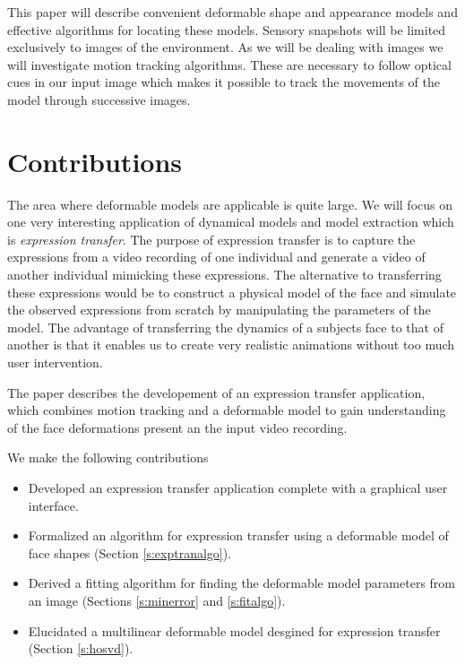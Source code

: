 \documentclass[11pt,a4paper]{report}
\begin{document}
This paper will describe convenient deformable shape
and appearance models and effective algorithms for locating these
models. Sensory snapshots will be limited exclusively to images of the environment. As we will be dealing
with images we will investigate motion tracking algorithms. These are necessary
to follow optical cues in our input image which makes it possible to track the
movements of the model through successive images.

\section{Contributions}

The area where deformable models are applicable is quite large. We will focus on one very interesting application of dynamical
models and model extraction which is
\textit{expression transfer}. The purpose of expression transfer is to capture
the expressions from a video recording of one individual and
generate a video of another individual mimicking these
expressions. The alternative to transferring these expressions would
be to construct a physical model of the face and simulate the observed
expressions from scratch by manipulating the parameters of the model. The
advantage of transferring the dynamics of a subjects face to that of another is
that it enables us to
create very realistic animations without too much user intervention. 

The paper describes the developement of an expression transfer application, which combines motion tracking and a deformable
model to gain understanding of the face deformations present an the input video
recording. 

We make the following contributions
\begin{itemize}
\item Developed an expression transfer application complete with a graphical
  user interface. 
\item Formalized an algorithm for expression transfer using a deformable model
  of face shapes (Section \ref{s:exptranalgo}).
\item Derived a fitting algorithm for finding the deformable model
  parameters from an image (Sections \ref{s:minerror} and \ref{s:fitalgo}).
\item Elucidated a multilinear deformable model desgined for expression
  transfer (Section \ref{s:hosvd}). 
\end{itemize}

\newpage
\end{document}
